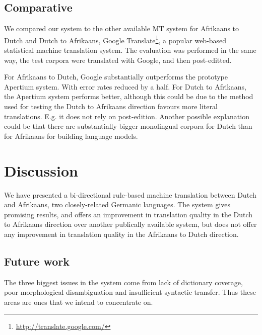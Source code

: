\documentclass[11pt]{article}
\begin{document}
\subsection{Comparative}

We compared our system to the other available MT system for Afrikaans to Dutch and Dutch to Afrikaans, 
Google Translate\footnote{\url{http://translate.google.com/}}, a popular web-based statistical machine
translation system. The evaluation was performed in the same way, the test corpora were translated with 
Google, and then post-editted.

For Afrikaans to Dutch, Google substantially outperforms the prototype Apertium system. With error rates 
reduced by a half. For Dutch to Afrikaans, the Apertium system performs better, although this could 
be due to the method used for testing the Dutch to Afrikaans direction favours more literal translations. E.g. 
it does not rely on post-edition. Another possible explanation could be that there are substantially bigger
monolingual corpora for Dutch than for Afrikaans for building language models.



\section{Discussion}

We have presented a bi-directional rule-based machine translation between Dutch and Afrikaans, 
two closely-related Germanic languages. The system gives promising results, and offers an improvement
in translation quality in the Dutch to Afrikaans direction over another publically available system, 
but does not offer any improvement in translation quality in the Afrikaans to Dutch direction.

\subsection{Future work}

The three biggest issues in the system come from lack of dictionary coverage, poor morphological
disambiguation and insufficient syntactic transfer. Thus these areas are ones that we intend to 
concentrate on.
\end{document}
